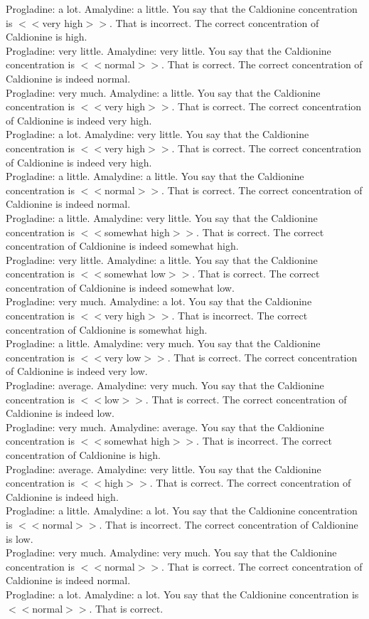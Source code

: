 \documentclass[pdflatex,sn-nature]{sn-jnl}%
\theoremstyle{thmstyleone}%
\theoremstyle{thmstyletwo}%
\theoremstyle{thmstylethree}%
\begin{document}
Progladine: a lot. Amalydine: a little. You say that the Caldionine concentration is $<<$very high$>>$. That is incorrect. The correct concentration of Caldionine is high. $~$\\ 
Progladine: very little. Amalydine: very little. You say that the Caldionine concentration is $<<$normal$>>$. That is correct. The correct concentration of Caldionine is indeed normal. $~$\\ 
Progladine: very much. Amalydine: a little. You say that the Caldionine concentration is $<<$very high$>>$. That is correct. The correct concentration of Caldionine is indeed very high. $~$\\ 
Progladine: a lot. Amalydine: very little. You say that the Caldionine concentration is $<<$very high$>>$. That is correct. The correct concentration of Caldionine is indeed very high. $~$\\ 
Progladine: a little. Amalydine: a little. You say that the Caldionine concentration is $<<$normal$>>$. That is correct. The correct concentration of Caldionine is indeed normal. $~$\\ 
Progladine: a little. Amalydine: very little. You say that the Caldionine concentration is $<<$somewhat high$>>$. That is correct. The correct concentration of Caldionine is indeed somewhat high. $~$\\ 
Progladine: very little. Amalydine: a little. You say that the Caldionine concentration is $<<$somewhat low$>>$. That is correct. The correct concentration of Caldionine is indeed somewhat low. $~$\\ 
Progladine: very much. Amalydine: a lot. You say that the Caldionine concentration is $<<$very high$>>$. That is incorrect. The correct concentration of Caldionine is somewhat high. $~$\\ 
Progladine: a little. Amalydine: very much. You say that the Caldionine concentration is $<<$very low$>>$. That is correct. The correct concentration of Caldionine is indeed very low. $~$\\ 
Progladine: average. Amalydine: very much. You say that the Caldionine concentration is $<<$low$>>$. That is correct. The correct concentration of Caldionine is indeed low. $~$\\ 
Progladine: very much. Amalydine: average. You say that the Caldionine concentration is $<<$somewhat high$>>$. That is incorrect. The correct concentration of Caldionine is high. $~$\\ 
Progladine: average. Amalydine: very little. You say that the Caldionine concentration is $<<$high$>>$. That is correct. The correct concentration of Caldionine is indeed high. $~$\\ 
Progladine: a little. Amalydine: a lot. You say that the Caldionine concentration is $<<$normal$>>$. That is incorrect. The correct concentration of Caldionine is low. $~$\\ 
Progladine: very much. Amalydine: very much. You say that the Caldionine concentration is $<<$normal$>>$. That is correct. The correct concentration of Caldionine is indeed normal. $~$\\ 
Progladine: a lot. Amalydine: a lot. You say that the Caldionine concentration is $<<$normal$>>$. That is correct.  
\end{document}
